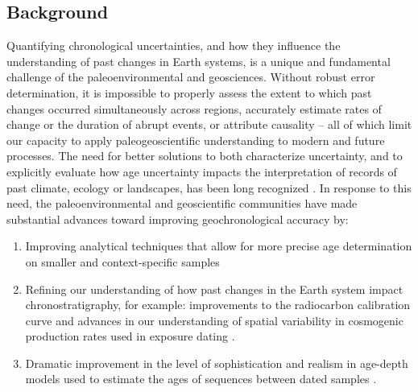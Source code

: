 \documentclass[gchron, manuscript]{copernicus}
\begin{document}
\introduction

\subsection{Background}

Quantifying chronological uncertainties, and how they influence the
understanding of past changes in Earth systems, is a unique and
fundamental challenge of the paleoenvironmental and geosciences. Without
robust error determination, it is impossible to properly assess the
extent to which past changes occurred simultaneously across regions,
accurately estimate rates of change or the duration of abrupt events, or
attribute causality -- all of which limit our capacity to apply
paleogeoscientific understanding to modern and future processes. The
need for better solutions to both characterize uncertainty, and to
explicitly evaluate how age uncertainty impacts the interpretation of
records of past climate, ecology or landscapes, has been long recognized
\citep[e.g.,][]{Noren2013, NASEM_CORES_2020}. In response to this need,
the paleoenvironmental and geoscientific communities have made
substantial advances toward improving geochronological accuracy by:

\begin{enumerate}
\def\labelenumi{\arabic{enumi}.}
\item
  Improving analytical techniques that allow for more precise age
  determination on smaller and context-specific samples
  \citep[e.g.,][]{Eggins2005, Santos_blank_2010, zander2020miniature}
\item
  Refining our understanding of how past changes in the Earth system
  impact chronostratigraphy, for example: improvements to the
  radiocarbon calibration curve \citep{Reimer09, intcal13, intcal20} and
  advances in our understanding of spatial variability in cosmogenic
  production rates used in exposure dating
  \citep{Balco2009, Masarik2009, charreau2019basinga}.
\item
  Dramatic improvement in the level of sophistication and realism in
  age-depth models used to estimate the ages of sequences between dated
  samples
  \citep[e.g.][]{parnell2008flexible, Ramsey2009Bayesian, Blaauw2010CLAM, Blaauw2011BACON}.
\end{enumerate}
\end{document}
